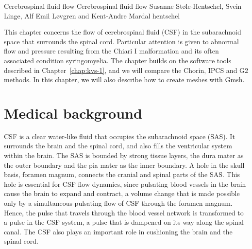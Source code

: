               {Cerebrospinal fluid flow}
              {Cerebrospinal fluid flow}
              {Susanne St\o le-Hentschel, Svein Linge, Alf Emil L{\o}vgren and Kent-Andre Mardal}
              {hentschel}


This chapter concerns the flow of cerebrospinal fluid (CSF) in the
subarachnoid space that surrounds the spinal cord. Particular
attention is given to abnormal flow and pressure resulting from the
Chiari I malformation and its often associated condition
syringomyelia. The chapter builds on the software tools described in
Chapter~\ref{chap:kvs-1}, and we will compare the Chorin, IPCS and G2
methods. In this chapter, we will also describe how to create meshes
with Gmsh.

\section{Medical background}

CSF is a clear water-like fluid that occupies the subarachnoid
space (SAS).  It surrounds the brain and the spinal cord, and also
fills the ventricular system within the brain. The SAS is bounded by
strong tissue layers, the dura mater as the outer boundary and the pia
mater as the inner boundary. A hole in the skull basis, foramen
magnum, connects the cranial and spinal parts of
the SAS. This hole is essential for CSF flow dynamics, since pulsating
blood vessels in the brain cause the brain to expand and contract, a
volume change that is made possible only by a simultaneous pulsating
flow of CSF through the foramen magnum. Hence, the pulse that travels
through the blood vessel network is transformed to a pulse in the CSF
system, a pulse that is dampened on its way along the spinal
canal. The CSF also plays an important role in cushioning the brain
and the spinal cord.

